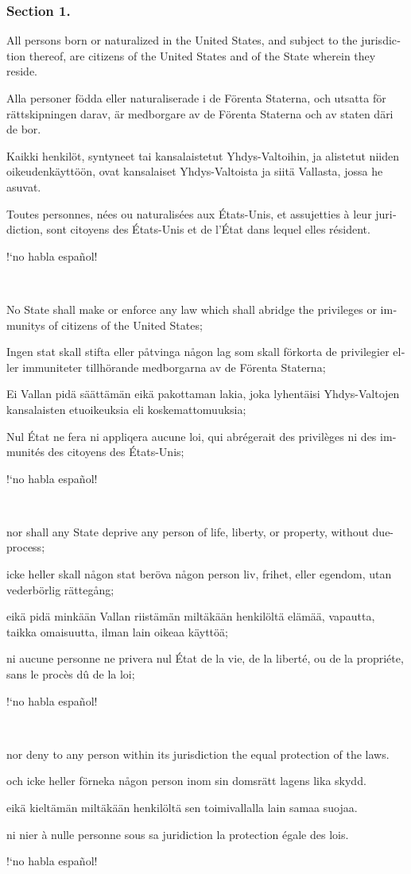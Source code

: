 \documentclass[a4paper,landscape,10pt]{article}
\newcommand{\tblock}[5]{\noindent\begin{minipage}[t]{0.18\textwidth}\foreignlanguage{english}{#1}\end{minipage}\hskip 0.025\textwidth\begin{minipage}[t]{0.18\textwidth}\foreignlanguage{swedish}{#2}\end{minipage}\hskip 0.025\textwidth\begin{minipage}[t]{0.18\textwidth}\foreignlanguage{finnish}{#3}\end{minipage}\hskip 0.025\textwidth\begin{minipage}[t]{0.18\textwidth}\foreignlanguage{french}{#4}\end{minipage}\hskip 0.025\textwidth\begin{minipage}[t]{0.18\textwidth}\foreignlanguage{spanish}{#5}\end{minipage}}
\begin{document}
\subsubsection*{Section 1.}
\tblock
{All persons born or naturalized in the United States, and subject to the jurisdiction thereof, are citizens of the United States and of the State wherein they reside.}
{Alla personer födda eller naturaliserade i de Förenta Staterna, och utsatta för rättskipningen darav, är medborgare av de Förenta Staterna och av staten däri de bor.}
{Kaikki henkilöt, syntyneet tai kansalaistetut Yhdys-Valtoihin, ja alistetut niiden oikeudenkäyttöön, ovat kansalaiset Yhdys-Valtoista ja siitä Vallasta, jossa he asuvat.}
{Toutes personnes, nées ou naturalisées aux États-Unis, et assujetties à leur juridiction, sont citoyens des États-Unis et de l'État dans lequel elles résident.}
{!`no habla español!}

~

\tblock
{No State shall make or enforce any law which shall \gls{abridge} the \glspl{privilege} or \glspl{immunity} of citizens of the United States;}
{Ingen stat skall stifta eller påtvinga någon lag som skall förkorta de privilegier eller immuniteter tillhörande medborgarna av de Förenta Staterna;}
{Ei Vallan pidä säättämän eikä pakottaman lakia, joka lyhentäisi Yhdys-Valtojen kansalaisten etuoikeuksia eli koskemattomuuksia;}
{Nul État ne fera ni appliqera aucune loi, qui abrégerait des privilèges ni des immunités des citoyens des États-Unis;}
{!`no habla español!}

~

\tblock
{nor shall any State deprive any person of life, liberty, or property, without \gls{due-process};}
{icke heller skall någon stat beröva någon person liv, frihet, eller egendom, utan vederbörlig rättegång;}
{eikä pidä minkään Vallan riistämän miltäkään henkilöltä elämää, vapautta, taikka omaisuutta, ilman lain oikeaa käyttöä;}
{ni aucune personne ne privera nul État de la vie, de la liberté, ou de la propriéte, sans le procès dû de la loi;}
{!`no habla español!}

	
~

\tblock
{nor deny to any person within its jurisdiction the equal protection of the laws.}
{och icke heller förneka någon person inom sin domsrätt lagens lika skydd.}
{eikä kieltämän miltäkään henkilöltä sen toimivallalla lain samaa suojaa.}
{ni nier à nulle personne sous sa juridiction la protection égale des lois.}
{!`no habla español!}

~
		
\end{document}
